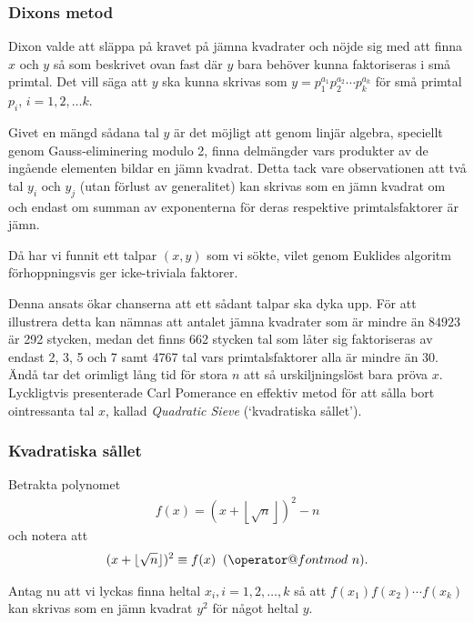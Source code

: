 \documentclass[a4paper,12pt]{article}
\makeatletter
\def\imod#1{\allowbreak\mkern10mu({\operator@font mod}\,\,#1)}
\renewcommand{\*}{\ensuremath{\cdot}}
\makeatother
\begin{document}
\subsubsection{Dixons metod}

Dixon valde att släppa på kravet på jämna kvadrater och nöjde sig med att finna
$x$ och $y$ så som beskrivet ovan fast där $y$ bara behöver kunna faktoriseras
i små primtal. Det vill säga att $y$ ska kunna skrivas som $y =
p_1^{a_1}p_2^{a_2} \cdots p_k^{a_k}$ för små primtal $p_i$, $i = 1, 2, \dots k$.

Givet en mängd sådana tal $y$ är det möjligt att genom linjär algebra, speciellt
genom Gauss-eliminering modulo 2, finna delmängder vars produkter av de ingående
elementen bildar en jämn kvadrat. Detta tack vare observationen att två tal
$y_i$ och $y_j$ (utan förlust av generalitet) kan skrivas som en jämn kvadrat om
och endast om summan av exponenterna för deras respektive primtalsfaktorer är
jämn.

Då har vi funnit ett talpar $(x, y)$ som vi sökte, vilet genom Euklides algoritm
förhoppningsvis ger icke-triviala faktorer.

Denna ansats ökar chanserna att ett sådant talpar ska dyka upp. För att
illustrera detta kan nämnas att antalet jämna kvadrater som är mindre än $84923$
är 292 stycken, medan det finns 662 stycken tal som låter sig faktoriseras av
endast 2, 3, 5 och 7 samt 4767 tal vars primtalsfaktorer alla är mindre än 30.
Ändå tar det orimligt lång tid för stora $n$ att så urskiljningslöst bara pröva
$x$. Lyckligtvis presenterade Carl Pomerance en effektiv metod för att sålla
bort ointressanta tal $x$, kallad \emph{Quadratic Sieve} (`kvadratiska sållet').


\subsubsection{Kvadratiska sållet}

Betrakta polynomet 
\begin{align*}
    f(x) = (x + \left\lfloor \sqrt{n} \right\rfloor)^2 - n
\end{align*}
och notera att
\begin{align*}
    (x + \lfloor \sqrt{n} \rfloor)^2 \equiv f(x) \imod{n}.
\end{align*}

Antag nu att vi lyckas finna heltal $x_i, i = 1, 2, \dots, k$ så att
$f(x_1)f(x_2)\cdots f(x_k)$ kan skrivas som en jämn kvadrat $y^2$ för något
heltal $y$.
\end{document}
